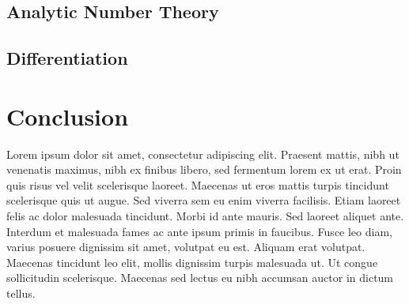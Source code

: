 \documentclass{article}
\theoremstyle{definition}
\begin{document}
\subsection{Analytic Number Theory}\label{ssec:ant}

\subsection{Differentiation}\label{ssec:differentiation}

\section{Conclusion}\label{ssec:conclusion}

Lorem ipsum dolor sit amet, consectetur adipiscing elit. Praesent mattis, nibh ut venenatis maximus, nibh ex finibus libero, sed fermentum lorem ex ut erat. Proin quis risus vel velit scelerisque laoreet. Maecenas ut eros mattis turpis tincidunt scelerisque quis ut augue. Sed viverra sem eu enim viverra facilisis. Etiam laoreet felis ac dolor malesuada tincidunt. Morbi id ante mauris. Sed laoreet aliquet ante. Interdum et malesuada fames ac ante ipsum primis in faucibus. Fusce leo diam, varius posuere dignissim sit amet, volutpat eu est. Aliquam erat volutpat. Maecenas tincidunt leo elit, mollis dignissim turpis malesuada ut. Ut congue sollicitudin scelerisque. Maecenas sed lectus eu nibh accumsan auctor in dictum tellus.

\nocite{*}
\printbibliography
\end{document}
